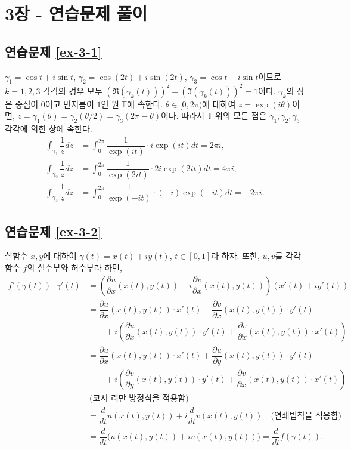 
\section*{3장 - 연습문제 풀이}

\subsection*{연습문제 \ref{ex-3-1}}

$\gamma_1 = \cos t + i\sin t$, $\gamma_2 = \cos (2t) + i\sin (2t)$,
$\gamma_3 = \cos t - i\sin t$이므로
$k=1,2,3$ 각각의 경우 모두 $(\Re(\gamma_k(t)))^2 + (\Im(\gamma_k(t)))^2=1$이다.
$\gamma_k$의 상은 중심이 $0$이고 반지름이 $1$인 원 $\mathbb T$에 속한다.
$\theta \in [0,2\pi)$에 대하여 $z = \exp(i\theta)$이면,
$z = \gamma_1(\theta) = \gamma_2(\theta/2) = \gamma_3(2\pi - \theta)$이다.
따라서 $\mathbb T$ 위의 모든 점은 $\gamma_1, \gamma_2, \gamma_3$ 각각에 의한 상에
속한다.
\begin{align*}
\int_{\gamma_1} \dfrac1z dz &= \int_0^{2\pi} \dfrac1{\exp(it)}\cdot i\exp(it)dt = 2\pi i, \\
\int_{\gamma_2} \dfrac1z dz &= \int_0^{2\pi} \dfrac1{\exp(2it)}\cdot 2i\exp(2it)dt = 4\pi i, \\
\int_{\gamma_3} \dfrac1z dz &= \int_0^{2\pi} \dfrac1{\exp(-it)}\cdot (-i)\exp(-it)dt = -2\pi i.
\end{align*}

\subsection*{연습문제 \ref{ex-3-2}}

실함수 $x,y$에 대하여 $\gamma(t) = x(t) +iy(t)$, $t\in[0,1]$라 하자.
또한, $u,v$를 각각 함수 $f$의 실수부와 허수부라 하면,
\begin{align*}
f'(\gamma(t))\cdot\gamma'(t)
&= \left( \dfrac{\partial u}{\partial x}(x(t),y(t)) +
i \dfrac{\partial v}{\partial x}(x(t),y(t)) \right) (x'(t) + iy'(t)) \\
&= \dfrac{\partial u}{\partial x}(x(t),y(t)) \cdot x'(t) - \dfrac{\partial v}{\partial x}(x(t),y(t))\cdot y'(t) \\
&\qquad +i\left( \dfrac{\partial u}{\partial x}(x(t),y(t)) \cdot y'(t) 
+ \dfrac{\partial v}{\partial x}(x(t),y(t))\cdot x'(t) \right) \\
&= \dfrac{\partial u}{\partial x}(x(t),y(t)) \cdot x'(t) + \dfrac{\partial u}{\partial y}(x(t),y(t))\cdot y'(t) \\
&\qquad +i\left( \dfrac{\partial v}{\partial y}(x(t),y(t)) \cdot y'(t) + \dfrac{\partial v}{\partial x}(x(t),y(t))\cdot x'(t) \right) \\
&\ \text{(코시-리만 방정식을 적용함)} \\
&= \dfrac d{dt} u(x(t), y(t)) + i \dfrac d{dt} v(x(t),y(t)) \quad\text{(연쇄법칙을 적용함)} \\
&= \dfrac d{dt} \Big(u(x(t), y(t)) + i v(x(t),y(t)) \Big) = \dfrac d{dt} f(\gamma(t)).
\end{align*}

